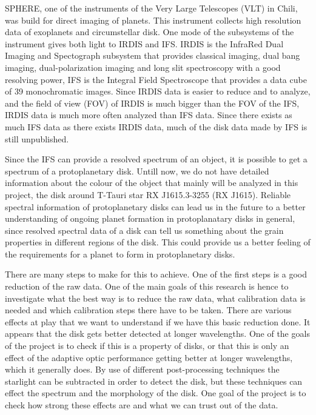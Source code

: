\documentclass[twoside,single]{lion-msc}
\begin{document}
SPHERE, one of the instruments of the Very Large Telescopes (VLT) in Chili, was build for direct imaging of planets. This instrument collects high resolution data of exoplanets and circumstellar disk. One mode of the subsystems of the instrument gives both light to IRDIS and IFS. IRDIS is the InfraRed Dual Imaging and Spectograph subsystem that provides classical imaging, dual bang imaging, dual-polarization imaging and long slit spectroscopy with a good resolving power, IFS is the Integral Field Spectroscope that provides a data cube of 39 monochromatic images. \cite{Observatory2007} Since IRDIS data is easier to reduce and to analyze, and the field of view (FOV) of IRDIS is much bigger than the FOV of the IFS, IRDIS data is much more often analyzed than IFS data. Since there exists as much IFS data as there exists IRDIS data, much of the disk data made by IFS is still unpublished.
\bigskip

Since the IFS can provide a resolved spectrum of an object, it is possible to get a spectrum of a protoplanetary disk. Untill now, we do not have detailed information about the colour of the object that mainly will be analyzed in this project, the disk around T-Tauri star RX J1615.3-3255 (RX J1615). Reliable spectral information of protoplanetary disks can lead us in the future to a better understanding of ongoing planet formation in protoplanatary disks in general, since resolved spectral data of a disk can tell us something about the grain properties in different regions of the disk. This could provide us a better feeling of the requirements for a planet to form in protoplanetary disks. 
\bigskip

There are many steps to make for this to achieve. One of the first steps is a good reduction of the raw data. One of the main goals of this research is hence to investigate what the best way is to reduce the raw data, what calibration data is needed and which calibration steps there have to be taken. There are various effects at play that we want to understand if we have this basic reduction done. It appears that the disk gets better detected at longer wavelengths. One of the goals of the project is to check if this is a property of disks, or that this is only an effect of the adaptive optic performance getting better at longer wavelengths, which it generally does. By use of different post-processing techniques the starlight can be subtracted in order to detect the disk, but these techniques can effect the spectrum and the morphology of the disk. One goal of the project is to check how strong these effects are and what we can trust out of the data.
\bigskip
\end{document}
